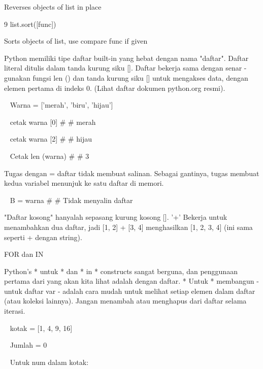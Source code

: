 \vspace{12pt}
Reverses objects of list in place \par
9 \hspace*{0.5in} list.sort([func]) \par
\vspace{12pt}
Sorts objects of list, use compare func if given \par
\vspace{12pt}
Python memiliki tipe daftar built-in yang hebat dengan nama "daftar". Daftar literal ditulis dalam tanda kurung siku []. Daftar bekerja sama dengan senar - gunakan fungsi len () dan tanda kurung siku [] untuk mengakses data, dengan elemen pertama di indeks 0. (Lihat daftar dokumen python.org resmi). \par
\vspace{12pt}
~ Warna = ['merah', 'biru', 'hijau'] \par
~ cetak warna [0]    \#     \#   merah \par
~ cetak warna [2]    \#     \#   hijau \par
~ Cetak len (warna)    \#     \#   3 \par
\vspace{12pt}
\vspace{12pt}
  \par
Tugas dengan = daftar tidak membuat salinan. Sebagai gantinya, tugas membuat kedua variabel menunjuk ke satu daftar di memori. \par
\vspace{12pt}
~ B = warna    \#     \#   Tidak menyalin daftar \par
  \par
"Daftar kosong" hanyalah sepasang kurung kosong []. '+' Bekerja untuk menambahkan dua daftar, jadi [1, 2] + [3, 4] menghasilkan [1, 2, 3, 4] (ini sama seperti + dengan string). \par
FOR dan IN \par
\vspace{12pt}
Python's * untuk * dan * in * constructs sangat berguna, dan penggunaan pertama dari yang akan kita lihat adalah dengan daftar. * Untuk * membangun - untuk daftar var - adalah cara mudah untuk melihat setiap elemen dalam daftar (atau koleksi lainnya). Jangan menambah atau menghapus dari daftar selama iterasi. \par
\vspace{12pt}
~ kotak = [1, 4, 9, 16] \par
~ Jumlah = 0 \par
~ Untuk num dalam kotak: \par
